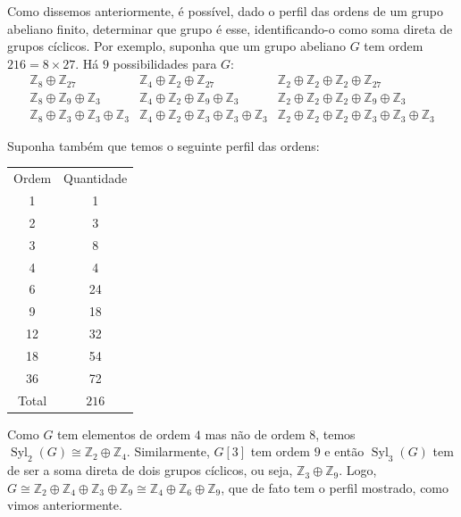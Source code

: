 \documentclass[a4paper,portuguese,11pt,twoside, leqno]{book}
\DeclareMathOperator{\syl}{Syl}
\theoremstyle{definition}
\begin{document}
	\par\vspace{0.3cm} Como dissemos anteriormente, é possível, dado o perfil das ordens de um grupo abeliano finito, determinar que grupo é esse, identificando-o como soma direta de grupos cíclicos. Por exemplo, suponha que um grupo abeliano $G$ tem ordem $216=8\times 27$. Há $9$ possibilidades para $G$:
	\begin{equation*}
		\begin{array}{lll}
			\mathbb{Z}_8\oplus\mathbb{Z}_{27} & \mathbb{Z}_4\oplus\mathbb{Z}_2\oplus\mathbb{Z}_{27} & \mathbb{Z}_2\oplus\mathbb{Z}_2\oplus\mathbb{Z}_2\oplus\mathbb{Z}_{27} \\
			\mathbb{Z}_8\oplus\mathbb{Z}_9\oplus\mathbb{Z}_3 & \mathbb{Z}_4\oplus\mathbb{Z}_2\oplus\mathbb{Z}_9\oplus\mathbb{Z}_3 & \mathbb{Z}_2\oplus\mathbb{Z}_2\oplus\mathbb{Z}_2\oplus\mathbb{Z}_9\oplus\mathbb{Z}_3 \\
			\mathbb{Z}_8\oplus\mathbb{Z}_3\oplus\mathbb{Z}_3\oplus\mathbb{Z}_3 & \mathbb{Z}_4\oplus\mathbb{Z}_2\oplus\mathbb{Z}_3\oplus\mathbb{Z}_3\oplus\mathbb{Z}_3 & \mathbb{Z}_2\oplus\mathbb{Z}_2\oplus\mathbb{Z}_2\oplus\mathbb{Z}_3\oplus\mathbb{Z}_3\oplus\mathbb{Z}_3	
		\end{array}
	\end{equation*}
	\par\vspace{0.3cm} Suponha também que temos o seguinte perfil das ordens:
	\begin{center}
		\begin{tabular}{|c|c|}
			\cline{1-2}
			Ordem & Quantidade  \\
			\cline{1-2}
			1 & 1  \\
			\cline{1-2}
			2 & 3 \\
			\cline{1-2}
			3 & 8 \\
			\cline{1-2}
			4 & 4 \\
			\cline{1-2}
			6 & 24 \\
			\cline{1-2}
			9 & 18 \\
			\cline{1-2}
			12 & 32  \\
			\cline{1-2}
			18 & 54 \\
			\cline{1-2}
			36 & 72  \\
			\cline{1-2}
			Total & $216$ \\
			\cline{1-2}
		\end{tabular}
	\end{center}
	\par\vspace{0.3cm} Como $G$ tem elementos de ordem $4$ mas não de ordem $8$, temos $\syl_2(G)\cong \mathbb{Z}_2\oplus\mathbb{Z}_4$. Similarmente, $G[3]$ tem ordem $9$ e então $\syl_3(G)$ tem de ser a soma direta de dois grupos cíclicos, ou seja, $\mathbb{Z}_3\oplus\mathbb{Z}_9$. Logo, $G \cong \mathbb{Z}_2\oplus\mathbb{Z}_4\oplus\mathbb{Z}_3\oplus\mathbb{Z}_9\cong \mathbb{Z}_4\oplus\mathbb{Z}_6\oplus\mathbb{Z}_9$, que de fato tem o perfil mostrado, como vimos anteriormente.
	
\end{document}
